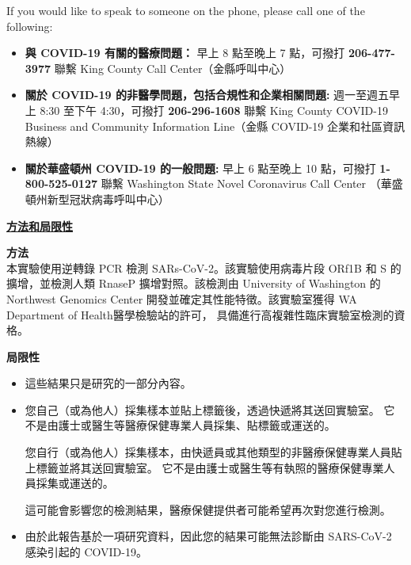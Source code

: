 \documentclass[10pt]{article}
\begin{document}
If you would like to speak to someone on the phone, please call one of the
following:

\begin{itemize}

\item

  \textbf{與 COVID-19 有關的醫療問題：} 早上 8 點至晚上 7 點，可撥打
  \textbf{206-477-3977} 聯繫 King County Call Center（金縣呼叫中心）

\item

  \textbf{關於 COVID-19 的非醫學問題，包括合規性和企業相關問題:} 週一至週五早上 8:30
  至下午 4:30，可撥打 \textbf{206-296-1608} 聯繫 King County COVID-19 Business and Community
  Information Line（金縣 COVID-19 企業和社區資訊熱線）

\item

  \textbf{關於華盛頓州 COVID-19 的一般問題:} 早上 6 點至晚上 10 點，可撥打
  \textbf{1-800-525-0127} 聯繫 Washington State Novel Coronavirus Call Center
  （華盛頓州新型冠狀病毒呼叫中心）

\end{itemize}

\bigskip

\large \underline{\textbf{方法和局限性}}

\textbf{方法}\\
本實驗使用逆轉錄 PCR 檢測 SARs-CoV-2。該實驗使用病毒片段 ORf1B 和 S 的擴增，並檢測人類
RnaseP 擴增對照。該檢測由 University of Washington 的 Northwest Genomics Center
開發並確定其性能特徵。該實驗室獲得 WA Department of Health醫學檢驗站的許可，
具備進行高複雜性臨床實驗室檢測的資格。

\textbf{局限性}

\begin{itemize}

\item

  這些結果只是研究的一部分內容。

\item
  您自己（或為他人）採集樣本並貼上標籤後，透過快遞將其送回實驗室。
  它不是由護士或醫生等醫療保健專業人員採集、貼標籤或運送的。

  您自行（或為他人）採集樣本，由快遞員或其他類型的非醫療保健專業人員貼上標籤並將其送回實驗室。
  它不是由護士或醫生等有執照的醫療保健專業人員採集或運送的。


  這可能會影響您的檢測結果，醫療保健提供者可能希望再次對您進行檢測。

\item

  由於此報告基於一項研究資料，因此您的結果可能無法診斷由 SARS-CoV-2 感染引起的 COVID-19。

\end{itemize}
\end{document}
